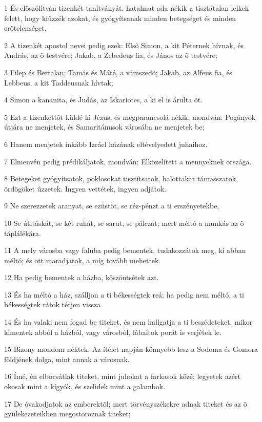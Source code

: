 \par 1 És elõszólítván tizenkét tanítványát, hatalmat ada nékik a tisztátalan lelkek felett, hogy kiûzzék azokat, és gyógyítsanak minden betegséget és minden erõtelenséget.
\par 2 A tizenkét apostol nevei pedig ezek: Elsõ Simon, a kit Péternek hívnak, és András, az õ testvére; Jakab, a Zebedeus fia, és János az õ testvére;
\par 3 Filep és Bertalan; Tamás és Máté, a vámszedõ; Jakab, az Alfeus fia, és Lebbeus, a kit Taddeusnak hívtak;
\par 4 Simon a kananita, és Judás, az Iskariotes, a ki el is árulta õt.
\par 5 Ezt a tizenkettõt küldé ki Jézus, és megparancsolá nékik, mondván: Pogányok útjára ne menjetek, és Samaritánusok városába ne menjetek be;
\par 6 Hanem menjetek inkább Izráel házának eltévelyedett juhaihoz.
\par 7 Elmenvén pedig prédikáljatok, mondván: Elközelített a mennyeknek országa.
\par 8 Betegeket gyógyítsatok, poklosokat tisztítsatok, halottakat támasszatok, ördögöket ûzzetek. Ingyen vettétek, ingyen adjátok.
\par 9 Ne szerezzetek aranyat, se ezüstöt, se réz-pénzt a ti erszényetekbe,
\par 10 Se útitáskát, se két ruhát, se sarut, se pálczát; mert  méltó a munkás az õ táplálékára.
\par 11 A mely városba vagy faluba pedig bementek, tudakozzátok meg, ki abban méltó; és ott maradjatok, a míg tovább mehettek.
\par 12 Ha pedig bementek a házba, köszöntsétek azt.
\par 13 És ha méltó a ház, szálljon a ti békességtek reá; ha pedig nem méltó, a ti békességtek rátok térjen vissza.
\par 14 És ha valaki nem fogad be titeket, és nem hallgatja a ti beszédeteket, mikor kimentek abból a házból, vagy városból, lábaitok porát is verjétek le.
\par 15 Bizony mondom néktek: Az ítélet napján könnyebb lesz a Sodoma és Gomora földjének dolga, mint annak a városnak.
\par 16 Ímé, én elbocsátlak titeket, mint juhokat a farkasok közé;  legyetek azért okosak mint a kígyók, és szelidek mint a galambok.
\par 17 De óvakodjatok az emberektõl; mert törvényszékekre adnak titeket és az õ gyülekezeteikben megostoroznak titeket;
